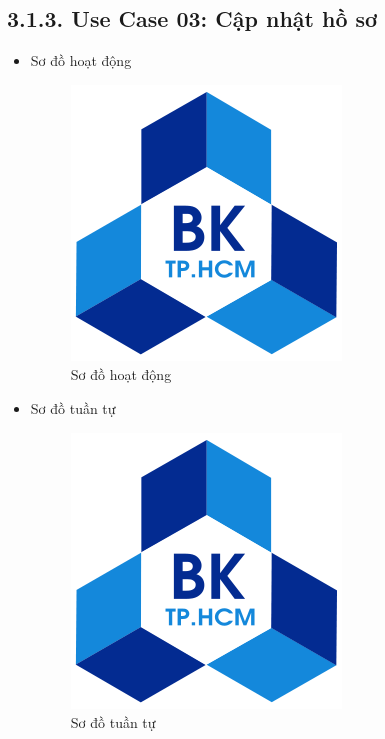 \subsection*{3.1.3. Use Case 03: Cập nhật hồ sơ}
\begin{itemize}
    \item Sơ đồ hoạt động
    \begin{figure}[H]
    \centering
    \includegraphics[scale=0.5 ]{Picture/hcmut.png}
    \caption{Sơ đồ hoạt động }
    \end{figure}
    \item Sơ đồ tuần tự
    \begin{figure}[H]
    \centering
    \includegraphics[scale=0.5 ]{Picture/hcmut.png}
    \caption{Sơ đồ tuần tự }
    \end{figure}
\end{itemize}
